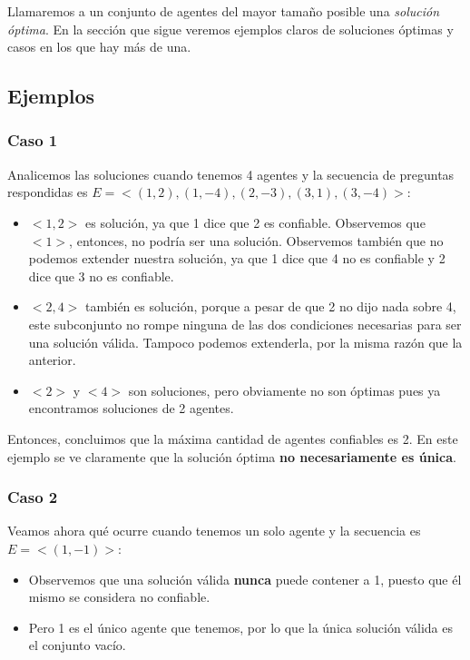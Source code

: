 \documentclass[10pt, a4paper]{article}
\begin{document}
		Llamaremos a un conjunto de agentes del mayor tama\~no posible una \textit{soluci\'on \'optima}. En la secci\'on que sigue veremos ejemplos claros de soluciones \'optimas y casos en los que hay m\'as de una.
	
	\subsection{Ejemplos}
	
	\subsubsection{Caso 1}
	
		Analicemos las soluciones cuando tenemos 4 agentes y la secuencia de preguntas respondidas es $E = <(1,2), (1,-4), (2,-3), (3,1), (3,-4)>$:
		
		\begin{itemize}
		\item $<1, 2>$ es soluci\'on, ya que 1 dice que 2 es confiable. Observemos que $<1>$, entonces, no podr\'ia ser una soluci\'on. Observemos tambi\'en que no podemos extender nuestra soluci\'on, ya que 1 dice que 4 no es confiable y 2 dice que 3 no es confiable.
		\item $<2,4>$ tambi\'en es soluci\'on, porque a pesar de que 2 no dijo nada sobre 4, este subconjunto no rompe ninguna de las dos condiciones necesarias para ser una soluci\'on v\'alida. Tampoco podemos extenderla, por la misma raz\'on que la anterior.
		\item $<2>$ y $<4>$ son soluciones, pero obviamente no son \'optimas pues ya encontramos soluciones de 2 agentes.
		\end{itemize}
		
		Entonces, concluimos que la m\'axima cantidad de agentes confiables es 2. En este ejemplo se ve claramente que la soluci\'on \'optima \textbf{no necesariamente es \'unica}.
		
	\subsubsection{Caso 2}
	
		Veamos ahora qu\'e ocurre cuando tenemos un solo agente y la secuencia es $E = <(1,-1)>$:
		
		\begin{itemize}
		\item Observemos que una soluci\'on v\'alida \textbf{nunca} puede contener a 1, puesto que \'el mismo se considera no confiable.
		\item Pero 1 es el \'unico agente que tenemos, por lo que la \'unica soluci\'on v\'alida es el conjunto vac\'io.
		\end{itemize}
		
\end{document}
